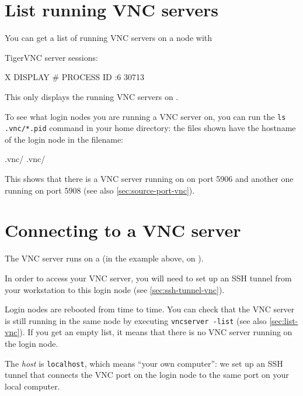 \section{List running VNC servers}
\label{sec:list-vnc}

You can get a list of running VNC servers on a node with

\begin{prompt}
TigerVNC server sessions:

X DISPLAY #	PROCESS ID
:6		    30713
\end{prompt}

This only displays the running VNC servers on .

To see what login nodes you are running a VNC server on, you can run the \lstinline|ls .vnc/*.pid|
command in your home directory: the files shown have the hostname of the login node in the filename:

\begin{prompt}
.vnc/%
.vnc/%
\end{prompt}

This shows that there is a VNC server running on \texttt{\loginhost{}} on port 5906
and another one running \texttt{\altloginhost{}} on port 5908 (see also \autoref{sec:source-port-vnc}).

\section{Connecting to a VNC server}

The VNC server runs on a  (in the example above, on \texttt{\loginhost{}}).

In order to access your VNC server, you will need to set up an SSH tunnel from your workstation
to this login node (see \autoref{sec:ssh-tunnel-vnc}).

Login nodes are rebooted from time to time. You can check that the VNC server is still
running in the same node by executing \lstinline|vncserver -list| (see also \autoref{sec:list-vnc}).
If you get an empty list, it means that there is no VNC server running on the login node.


The \emph{host} is \lstinline|localhost|, which means ``your own computer'': we set up an SSH tunnel that connects
the VNC port on the login node to the same port on your local computer.

